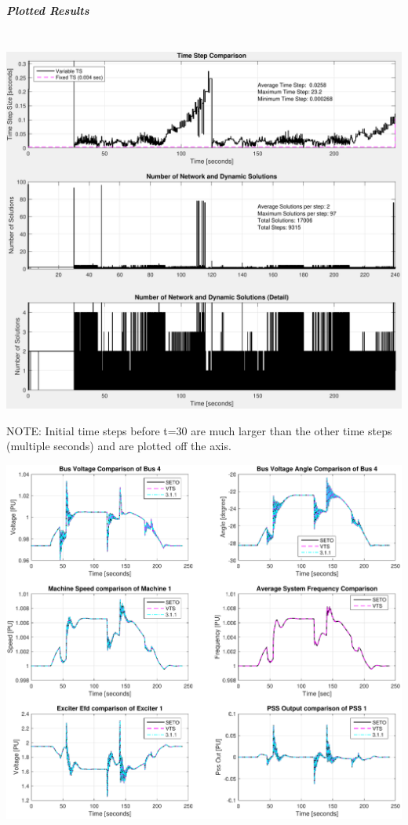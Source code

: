 \documentclass[12pt]{article}
\begin{document}
\pagebreak

 

\subparagraph{Plotted Results} \ \\
\includegraphics[width=\linewidth]{verSteps}

NOTE: Initial time steps before t=30 are much larger than the other time steps (multiple seconds) and are plotted off the axis.

\includegraphics[width=\linewidth]{verComp}
\end{document}
